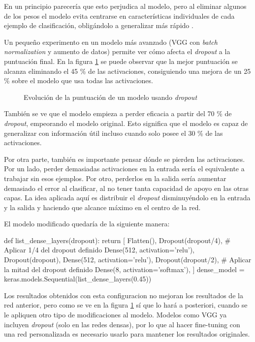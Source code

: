 En un principio parecería que esto perjudica al modelo, pero al eliminar algunos de los pesos el modelo evita centrarse en características individuales de cada ejemplo de clasificación, obligándolo a generalizar más rápido \parencite{dropout}.

Un pequeño experimento en un modelo más avanzado (VGG con \textit{batch normalization} y aumento de datos) permite ver cómo afecta el \textit{dropout} a la puntuación final. En la figura \ref{dropout} se puede observar que la mejor puntuación se alcanza eliminando el 45 \% de las activaciones, consiguiendo una mejora de un 25 \% sobre el modelo que usa todas las activaciones.

\begin{figure}
    \caption{Evolución de la puntuación de un modelo usando \textit{dropout}}
\label{dropout}
\end{figure}

También se ve que el modelo empieza a perder eficacia a partir del 70 \% de \textit{dropout}, empeorando el modelo original. Esto significa que el modelo es capaz de generalizar con información útil incluso cuando solo posee el 30 \% de las activaciones.

Por otra parte, también es importante pensar dónde se pierden las activaciones.
Por un lado, perder demasiadas activaciones en la entrada sería el equivalente
a trabajar sin esos ejemplos. Por otro, perderlos en la salida sería aumentar
demasiado el error al clasificar, al no tener tanta capacidad de apoyo en las
otras capas.  La idea aplicada aquí es distribuir el \textit{dropout}
disminuyéndolo en la entrada y la salida y haciendo que alcance máximo
en el centro de la red.

El modelo modificado quedaría de la siguiente manera:

\begin{python}
def list_dense_layers(dropout):
    return [
        Flatten(),
        Dropout(dropout/4),  # Aplicar 1/4 del dropout definido 
        Dense(512, activation='relu'),
        Dropout(dropout),
        Dense(512, activation='relu'),
        Dropout(dropout/2),  # Aplicar la mitad del dropout definido
        Dense(8, activation='softmax'),
    ]
dense_model = keras.models.Sequential(list_dense_layers(0.45))
\end{python}

Los resultados obtenidos con esta configuracion no mejoran los resultados de la red anterior, pero como se ve en la figura \ref{dropout} sí que lo hará a posteriori, cuando se le apliquen otro tipo de modificaciones al modelo. Modelos como VGG ya incluyen \textit{dropout} (solo en las redes densas), por lo que al hacer fine-tuning con una red personalizada es necesario usarlo para mantener los resultados originales.


